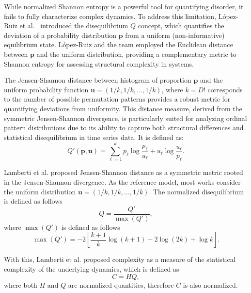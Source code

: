 While normalized Shannon entropy is a powerful tool for quantifying disorder, it fails to fully characterize complex dynamics. To address this limitation, López-Ruiz et al.~\cite{lopez1995statistical} introduced the disequilibrium $Q$ concept, which quantifies the deviation of a probability distribution $\mathbf{p}$ from a uniform (non-informative) equilibrium state. 
López-Ruiz and the team employed the Euclidean distance between $\mathbf{p}$ and the uniform distribution, providing a complementary metric to Shannon entropy for assessing structural complexity in systems.

The Jensen-Shannon distance between histogram of proportion $\mathbf{p}$ and the uniform probability function $\mathbf{u}=(1/k, 1/k, \dots, 1/k)$, where $k=D!$ corresponds to the number of possible permutation patterns provides a robust metric for quantifying deviations from uniformity. This distance measure, derived from the symmetric Jensen-Shannon divergence, is particularly suited for analyzing ordinal pattern distributions due to its ability to capture both structural differences and statistical disequilibrium in time series data.
It is defined as:
\begin{equation}
	Q'(\mathbf{p,u})=\sum^k_{\ell=1} p_\ell\log\dfrac{p_\ell}{u_\ell}+u_\ell\log\dfrac{u_\ell}{p_\ell}.
\end{equation}

Lamberti et al. \cite{lamberti2004intensive} proposed Jensen-Shannon distance as a symmetric metric rooted in the Jensen-Shannon divergence. As the reference model, most works consider the uniform distribution $\mathbf{u}=(1/k,1/k, \dots, 1/k)$. The normalized disequilibrium is defined as follows
\begin{equation}
	Q=\dfrac{Q'}{\max{(Q')}},
\end{equation}
where $\max(Q')$ is defined as follows
\begin{equation}
	\max(Q')=-2 \left[\dfrac{k+1}{k}\log(k+1)-2\log(2k)+\log k\right].
\end{equation}

With this, Lamberti et al. \cite{lamberti2004intensive} proposed complexity as a measure of the statistical complexity of the underlying dynamics, which is defined as 
\begin{equation}
	C=HQ,
\end{equation}
where both $H$ and $Q$ are normalized quantities, therefore $C$ is also normalized. 

